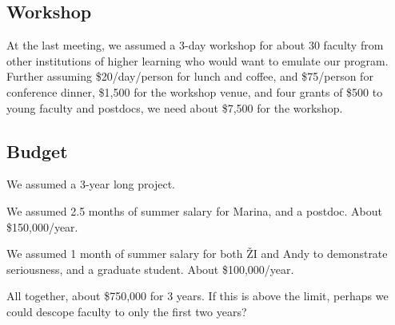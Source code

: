 \subsection{Workshop} 


At the last meeting, we assumed a 3-day workshop for about 30 faculty from other institutions
of higher learning who would want to emulate our program. Further assuming \$20/day/person
for lunch and coffee, and \$75/person for conference dinner, \$1,500 for the workshop venue,
and four grants of \$500 to young faculty and postdocs, we need about \$7,500 for the workshop. 



\subsection{Budget} 

We assumed a 3-year long project. 

We assumed 2.5 months of summer salary for Marina, and a postdoc. About \$150,000/year. 

We assumed 1 month of summer salary for both \v{Z}I and Andy to demonstrate seriousness,
and a graduate student. About \$100,000/year. 

All together, about \$750,000 for 3 years. If this is above the limit, perhaps we could 
descope faculty to only the first two years? 



